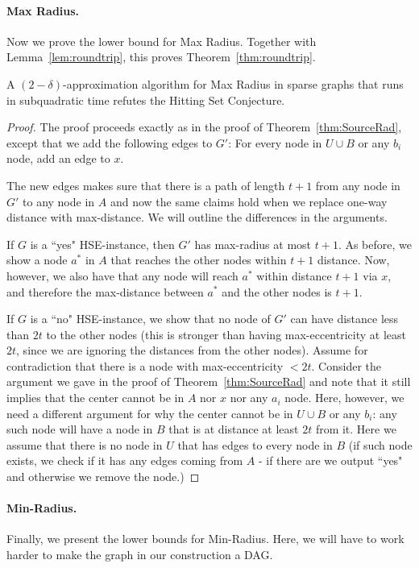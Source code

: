 \paragraph{Max Radius.} Now we prove the lower bound for Max Radius. Together with Lemma~\ref{lem:roundtrip}, this proves Theorem~\ref{thm:roundtrip}.

\begin{lemma}
\label{lem:max}
A $(2-\delta)$-approximation algorithm for Max Radius in sparse graphs that runs in subquadratic time refutes the Hitting Set Conjecture.
\end{lemma}

\begin{proof}
The proof proceeds exactly as in the proof of Theorem~\ref{thm:SourceRad}, except that we add the following edges to $G'$:
For every node in $U \cup B$ or any $b_i$ node, add an edge to $x$.

The new edges makes sure that there is a path of length $t+1$ from any node in $G'$ to any node in $A$ and now the same claims hold when we replace one-way distance with max-distance. 
We will outline the differences in the arguments.

If $G$ is a ``yes" HSE-instance, then $G'$ has max-radius at most $t+1$. 
As before, we show a node $a^*$ in $A$ that reaches the other nodes within $t+1$ distance.
Now, however, we also have that any node will reach $a^*$ within distance $t+1$ via $x$, and therefore the max-distance between $a^*$ and the other nodes is $t+1$.

If $G$ is a ``no" HSE-instance, we show that no node of $G'$ can have distance less than $2t$ to the other nodes (this is stronger than having max-eccentricity at least $2t$, since we are ignoring the distances from the other nodes).
Assume for contradiction that there is a node with max-eccentricity $<2t$.
Consider the argument we gave in the proof of Theorem~\ref{thm:SourceRad} and note that it still implies that the center cannot be in $A$ nor $x$ nor any $a_i$ node.
Here, however, we need a different argument for why the center cannot be in $U \cup B$ or any $b_i$:
any such node will have a node in $B$ that is at distance at least $2t$ from it. 
Here we assume that there is no node in $U$ that has edges to every node in $B$ (if such node exists, we check if it has any edges coming from $A$ - if there are we output ``yes" and otherwise we remove the node.)
\end{proof}


\paragraph{Min-Radius.} Finally, we present the lower bounds for Min-Radius. Here, we will have to work harder to make the graph in our construction a DAG.

